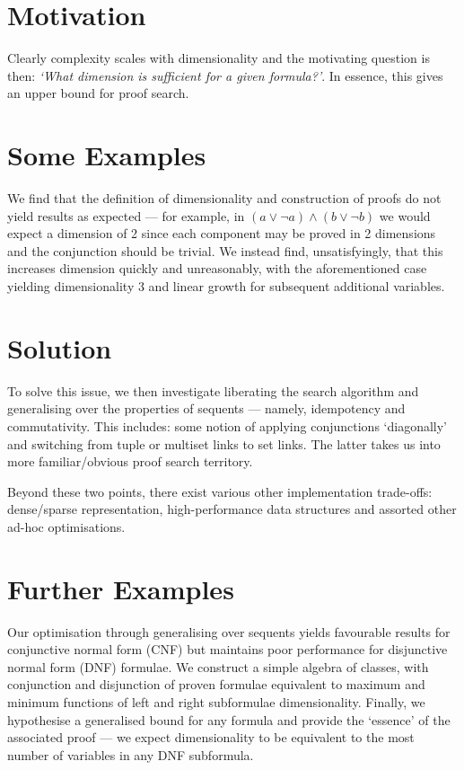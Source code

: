    \section*{Motivation}
        Clearly complexity scales with dimensionality and the motivating question is then: \textit{`What dimension is sufficient for a given formula?'}.
        In essence, this gives an upper bound for proof search.

    \section*{Some Examples}
        We find that the definition of dimensionality and construction of proofs do not yield results as expected --- for example, in $(a \vee \neg a) \wedge (b \vee \neg b)$ we would expect a dimension of 2 since each component may be proved in 2 dimensions and the conjunction should be trivial.
        We instead find, unsatisfyingly, that this increases dimension quickly and unreasonably, with the aforementioned case yielding dimensionality 3 and linear growth for subsequent additional variables.

    \section*{Solution}
        To solve this issue, we then investigate liberating the search algorithm and generalising over the properties of sequents --- namely, idempotency and commutativity.
        This includes: some notion of applying conjunctions `diagonally' and switching from tuple or multiset links to set links.
        The latter takes us into more familiar/obvious proof search territory.
        
        Beyond these two points, there exist various other implementation trade-offs: dense/sparse representation, high-performance data structures and assorted other ad-hoc optimisations.

    \section*{Further Examples}
        Our optimisation through generalising over sequents yields favourable results for conjunctive normal form (CNF) but maintains poor performance for disjunctive normal form (DNF) formulae.
        We construct a simple algebra of classes, with conjunction and disjunction of proven formulae equivalent to maximum and minimum functions of left and right subformulae dimensionality.
        Finally, we hypothesise a generalised bound for any formula and provide the `essence' of the associated proof --- we expect dimensionality to be equivalent to the most number of variables in any DNF subformula.

